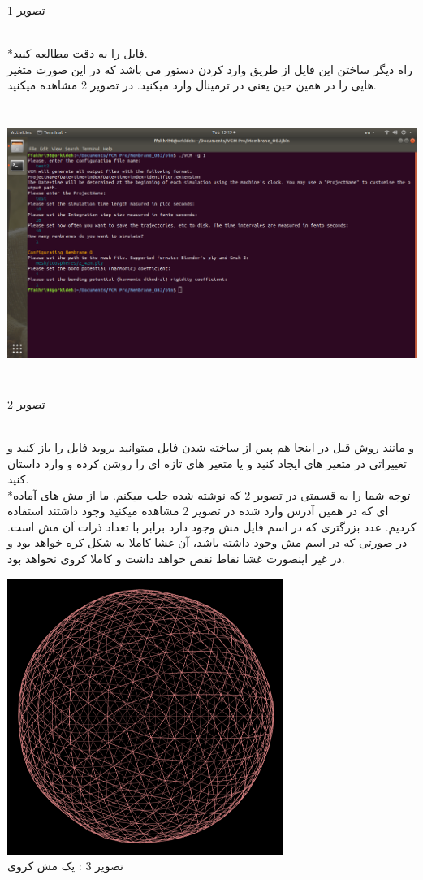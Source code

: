 \documentclass[12pt,onecolumn,a4paper]{report}
\begin{document}
{\begin{center}
\caption{تصویر 1}
\end{center}\\
*فایل را به دقت مطالعه کنید.\\
راه دیگر ساختن این فایل از طریق وارد کردن دستور  می باشد که در این صورت متغیر هایی را در همین حین یعنی در ترمینال وارد میکنید. در تصویر 2 مشاهده میکنید.\\
\begin{center}
\includegraphics[width=16cm, height=9cm]{02.png}
\caption{تصویر 2}
\end{center}\\
و مانند روش قبل در اینجا هم پس از ساخته شدن فایل میتوانید بروید فایل را باز کنید و تغییراتی در متغیر های ایجاد کنید و یا متغیر های تازه ای را روشن کرده و وارد داستان کنید.\\
*توجه شما را به قسمتی در تصویر 2 که   نوشته شده جلب میکنم. ما از مش های آماده ای که در همین آدرس وارد شده در تصویر 2 مشاهده میکنید وجود داشتند استفاده کردیم. عدد بزرگتری که در اسم فایل مش وجود دارد برابر با تعداد ذرات آن مش است. در صورتی که در اسم مش   وجود داشته باشد، آن غشا کاملا به شکل کره خواهد بود و در غیر اینصورت غشا نقاط نقص خواهد داشت و کاملا کروی نخواهد بود.\\
\begin{center}
\includegraphics[width=9cm, height=9cm]{03.png}\\
\caption{تصویر 3 : یک مش کروی}
\end{center}\\

}
\end{document}
